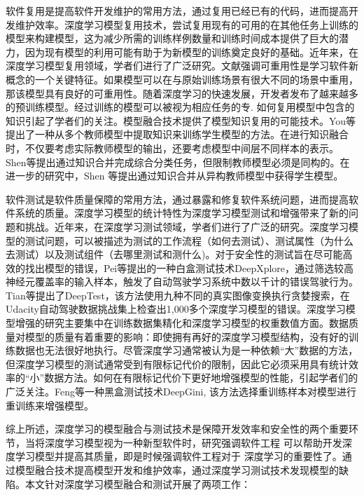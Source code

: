 \documentclass[fontset=macnew,UTF8]{article} %
\begin{document}
软件复用是提高软件开发维护的常用方法，通过复用已经已有的代码，进而提高开发维护效率\cite{poulin1996measuring}。深度学习模型复用技术，尝试复用现有的可用的在其他任务上训练的模型来构建模型，这为减少所需的训练样例数量和训练时间成本提供了巨大的潜力，因为现有模型的利用可能有助于为新模型的训练奠定良好的基础。近年来，在深度学习模型复用领域，学者们进行了广泛研究。文献\cite{zhou2016learnware}强调可重用性是学习软件新概念的一个关键特征。如果模型可以在与原始训练场景有很大不同的场景中重用，那该模型具有良好的可重用性。随着深度学习的快速发展，开发者发布了越来越多的预训练模型。经过训练的模型可以被视为相应任务的专\cite{yang2017deep}. 如何复用模型中包含的知识引起了学者们的关注。模型融合技术提供了模型知识复用的可能技术。You等\cite{you2017learning}提出了一种从多个教师模型中提取知识来训练学生模型的方法。在进行知识融合时，不仅要考虑实际教师模型的输出，还要考虑模型中间层不同样本的表示。Shen等\cite{shen2019amalgamating}提出通过知识合并完成综合分类任务，但限制教师模型必须是同构的。在进一步的研究中，Shen 等\cite{shen2019customizing}提出通过知识合并从异构教师模型中获得学生模型。

软件测试是软件质量保障的常用方法，通过暴露和修复软件系统问题，进而提高软件系统的质量\cite{landscapes}。深度学习模型的统计特性为深度学习模型测试和增强带来了新的问题和挑战。近年来，在深度学习测试领域，学者们进行了广泛的研究。深度学习模型的测试问题，可以被描述为测试的工作流程（如何去测试）、测试属性（为什么去测试）以及测试组件（去哪里测试和测什么)。对于安全性的测试旨在尽可能高效的找出模型的错误，Pei等\cite{pei2017deepxplore}提出的一种白盒测试技术DeepXplore，通过筛选较高神经元覆盖率的输入样本，触发了自动驾驶学习系统中数以千计的错误驾驶行为。Tian等\cite{tian2018deeptest}提出了DeepTest，该方法使用九种不同的真实图像变换执行贪婪搜索，在Udacity自动驾驶数据挑战集上检查出1,000多个深度学习模型的错误。深度学习模型增强的研究主要集中在训练数据集精化和深度学习模型的权重数值方面\cite{shen2020mcp}。数据质量对模型的质量有着重要的影响：即使拥有再好的深度学习模型结构，没有好的训练数据也无法很好地执行。尽管深度学习通常被认为是一种依赖“大”数据的方法，但深度学习模型的测试通常受到有限标记代价的限制，因此它必须采用具有统计效率的“小”数据方法\cite{Boosting}。如何在有限标记代价下更好地增强模型的性能，引起学者们的广泛关注。Feng等\cite{feng2020deepgini}一种黑盒测试技术DeepGini, 该方法选择重训练样本对模型进行重训练来增强模型。

综上所述，深度学习的模型融合与测试技术是保障开发效率和安全性的两个重要环节，当将深度学习模型视为一种新型软件时，研究强调软件工程 可以帮助开发深度学习模型并提高其质量，即是时候强调软件工程对于 深度学习\cite{menzies2019five}的重要性了。通过模型融合技术提高模型开发和维护效率，通过深度学习测试技术发现模型的缺陷。本文针对深度学习模型融合和测试开展了两项工作：
\end{document}

